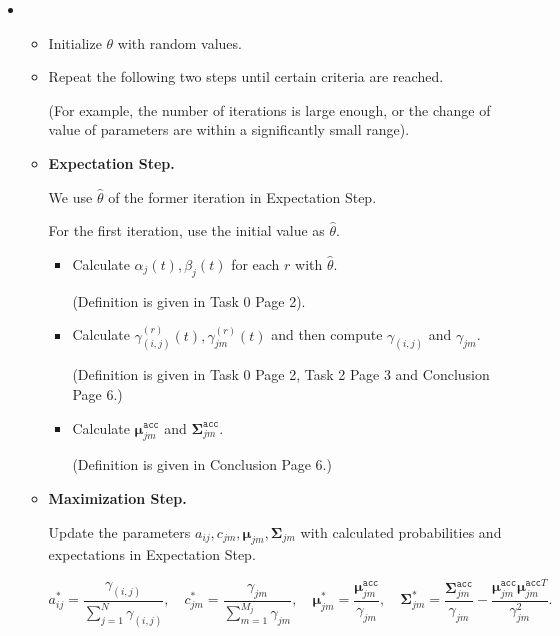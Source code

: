 \documentclass{article}
\begin{document}
     \begin{itemize}
         \item[] \begin{itemize}
             \item Initialize $\theta$ with random values.
             \item Repeat the following two steps until certain criteria are reached.
             
             (For example, the number of iterations is large enough, or the change of value of parameters are within a significantly small range).
             
             \item \textbf{Expectation Step.} 
             
             We use $\hat{\theta}$ of the former iteration in Expectation Step.
             
             For the first iteration, use the initial value as $\hat{\theta}$.
             
             \begin{itemize}
                 \item Calculate $\alpha_j(t),\beta_j(t)$ for each $r$ with $\hat{\theta}$.
                 
                 (Definition is given in Task 0 Page 2).
                 
                 \item Calculate $\gamma_{(i,j)}^{(r)}(t), \gamma_{jm}^{(r)}(t)$ and then compute $\gamma_{(i,j)}$ and $\gamma_{jm}$.
                 
                 (Definition is given in Task 0 Page 2, Task 2 Page 3 and Conclusion Page 6.)
                 
                 
                 \item Calculate $\boldsymbol{\mu}_{jm}^{\mathtt{acc}}$ and $\boldsymbol{\Sigma}_{jm}^{\mathtt{acc}}$.
                 
                 (Definition is given in Conclusion Page 6.)
             \end{itemize}
             
             \item \textbf{Maximization Step.}
             
             Update the parameters $a_{ij},c_{jm},\boldsymbol{\mu}_{jm},\boldsymbol{\Sigma}_{jm}$ with calculated probabilities and expectations in Expectation Step.
     
     \vspace{-2em}
     $$a_{ij}^*=\frac{\gamma_{(i,j)}}{\sum_{j=1}^N\gamma_{(i,j)}}, \quad
     c_{jm}^* =\frac{\gamma_{jm}}{\sum_{m=1}^{M_j}\gamma_{jm}},\quad \boldsymbol{\mu}_{jm}^*=\frac{\boldsymbol{\mu}_{jm}^{\mathtt{acc}}}{\gamma_{jm}}, \quad
     \boldsymbol{\Sigma}_{jm}^*=\frac{\boldsymbol{\Sigma}_{jm}^{\mathtt{acc}}}{\gamma_{jm}} - \frac{\boldsymbol{\mu}_{jm}^{\mathtt{acc}}\boldsymbol{\mu}_{jm}^{\mathtt{acc}T}}{\gamma_{jm}^2}.\qquad$$
             

\end{itemize}
\end{itemize}
\end{document}

